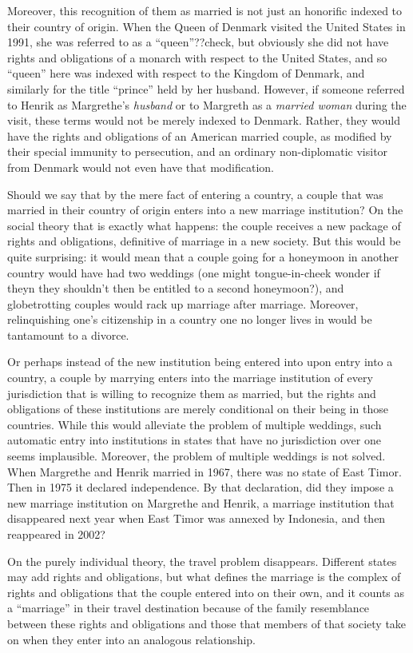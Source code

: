 Moreover, this recognition of them as married is not just an honorific indexed to their country of origin. When the Queen of Denmark visited the United States in 1991,
she was referred to as a ``queen''??check, but obviously she did not have rights and obligations of a monarch with respect to the United States, and so ``queen''
here was indexed with respect to the Kingdom of Denmark, and similarly for the title ``prince'' held by her husband. However, if someone referred to Henrik
as Margrethe's \textit{husband} or to Margreth as a \textit{married woman} during the visit, these terms would not be merely indexed to Denmark. Rather, they would
have the rights and obligations of an American married couple, as modified by their special immunity to persecution, and an ordinary non-diplomatic visitor from
Denmark would not even have that modification.

Should we say that by the mere fact of entering a country, a couple that was married in their country of origin enters into a new marriage institution?
On the social theory that is exactly what happens: the couple receives a new package of rights and obligations, definitive of marriage in a new society.
But this would be quite surprising: it would mean that a couple going for a honeymoon in another country would have had two weddings (one might tongue-in-cheek wonder if
theyn they shouldn't then be entitled to a second honeymoon?), and globetrotting couples would rack up marriage after marriage. Moreover, relinquishing one's
citizenship in a country one no longer lives in would be tantamount to a divorce.

Or perhaps instead of the new institution being entered into upon entry into a country, a couple by marrying enters into the marriage institution of every
jurisdiction that is willing to recognize them as married, but the rights and obligations of these institutions are merely conditional on their being in
those countries. While this would alleviate the problem of multiple weddings, such automatic entry into institutions in states that have no jurisdiction over one seems implausible.
Moreover, the problem of multiple weddings is not solved. When Margrethe and Henrik married in 1967, there was no state of East Timor. Then in
1975 it declared independence. By that declaration, did they impose a new marriage institution on Margrethe and Henrik, a marriage institution that disappeared
next year when East Timor was annexed by Indonesia, and then reappeared in 2002?

On the purely individual theory, the travel problem disappears. Different states may add rights and obligations, but what defines the marriage is the
complex of rights and obligations that the couple entered into on their own, and it counts as a ``marriage'' in their travel destination because of the
family resemblance between these rights and obligations and those that members of that society take on when they enter into an analogous relationship.

